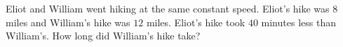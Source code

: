 Eliot and William went hiking at the same constant speed. Eliot's hike was $8$ miles and William's hike was $12$ miles. Eliot's hike took $40$ minutes less than William's. How long did William's hike take?
